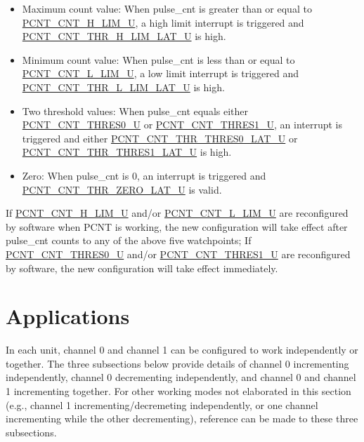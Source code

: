 \documentclass[main\_\_EN.tex]{subfiles}
\begin{document}
\begin{itemize}
    \item Maximum count value: When pulse\_cnt is greater than or equal to \hyperref[fielddesc:PCNTCNTHLIMUN]{PCNT\_CNT\_H\_LIM\_U}, a high limit interrupt is triggered and \hyperref[fielddesc:PCNTCNTTHRHLIMLATUN]{PCNT\_CNT\_THR\_H\_LIM\_LAT\_U} is high.
    \item Minimum count value: When pulse\_cnt is less than or equal to \hyperref[fielddesc:PCNTCNTLLIMUN]{PCNT\_CNT\_L\_LIM\_U}, a low limit interrupt is triggered and \hyperref[fielddesc:PCNTCNTTHRLLIMLATUN]{PCNT\_CNT\_THR\_L\_LIM\_LAT\_U} is high.
    \item Two threshold values: When pulse\_cnt equals either \hyperref[fielddesc:PCNTCNTTHRES0UN]{PCNT\_CNT\_THRES0\_U} or \hyperref[fielddesc:PCNTCNTTHRES1UN]{PCNT\_CNT\_THRES1\_U}, an interrupt is triggered and either \hyperref[fielddesc:PCNTCNTTHRTHRES0LATUN]{PCNT\_CNT\_THR\_THRES0\_LAT\_U} or \hyperref[fielddesc:PCNTCNTTHRTHRES1LATUN]{PCNT\_CNT\_THR\_THRES1\_LAT\_U} is high.
    \item Zero: When pulse\_cnt is 0, an interrupt is triggered and \hyperref[fielddesc:PCNTCNTTHRZEROLATUN]{PCNT\_CNT\_THR\_ZERO\_LAT\_U} is valid.
\end{itemize}

If \hyperref[fielddesc:PCNTCNTHLIMUN]{PCNT\_CNT\_H\_LIM\_U} and/or \hyperref[fielddesc:PCNTCNTLLIMUN]{PCNT\_CNT\_L\_LIM\_U} are reconfigured by software when PCNT is working, the new configuration will take effect after pulse\_cnt counts to any of the above five watchpoints; If \hyperref[fielddesc:PCNTCNTTHRES0UN]{PCNT\_CNT\_THRES0\_U} and/or \hyperref[fielddesc:PCNTCNTTHRES1UN]{PCNT\_CNT\_THRES1\_U} are reconfigured by software, the new configuration will take effect immediately.

\section{Applications}

In each unit, channel 0 and channel 1 can be configured to work independently or together. The three subsections below provide details of channel 0 incrementing independently, channel 0 decrementing independently, and channel 0 and channel 1 incrementing together. For other working modes not elaborated in this section (e.g., channel 1 incrementing/decremeting independently, or one channel incrementing while the other decrementing), reference can be made to these three subsections.
\end{document}
